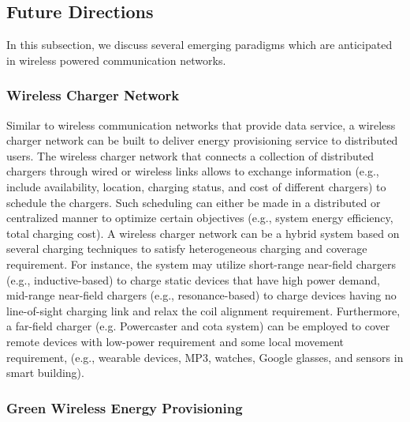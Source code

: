 \documentclass[twocolumn,10pt]{IEEEtran}
\begin{document}
\subsection{Future Directions}


In this subsection, we discuss several emerging paradigms which are anticipated in  wireless powered communication networks.  


\subsubsection{Wireless Charger Network}
Similar to wireless communication networks that provide data service, a wireless charger network can be built to deliver energy provisioning service to distributed users. The wireless charger network that connects a collection of distributed chargers through wired or wireless links allows to exchange information (e.g., include availability, location, charging status, and cost of different chargers) to schedule the chargers. Such scheduling can either be made in a distributed or centralized manner to optimize certain objectives (e.g., system energy efficiency, total charging cost). A wireless charger network can be a hybrid system based on several charging techniques to satisfy heterogeneous charging and coverage requirement. For instance, the system may utilize short-range near-field chargers (e.g., inductive-based) to charge static devices that have high power demand, mid-range near-field chargers (e.g., resonance-based) to charge devices having no line-of-sight charging link and relax the coil alignment requirement. Furthermore, a far-field charger (e.g. Powercaster and cota system) can be employed to cover remote devices with low-power requirement and some local movement requirement, (e.g., wearable devices, MP3, watches, Google glasses, and sensors in smart building).  

\subsubsection{Green Wireless Energy Provisioning}
\end{document}
